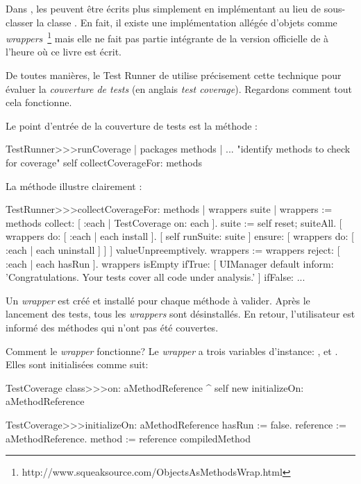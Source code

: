 \documentclass[a4paper,10pt,twoside]{book}
\begin{document}
Dans \pharo, les  peuvent être écrits plus simplement 
en implémentant  au lieu de sous-classer la classe .
En fait, il existe une implémentation allégée d'objets comme \emph{wrappers}~\footnote{http://www.squeaksource.com/ObjectsAsMethodsWrap.html} mais elle ne fait pas partie intégrante de la version officielle de \pharo à l'heure où ce livre est écrit.

De toutes manières, le Test Runner de \pharo utilise précisement cette technique pour évaluer la \emph{couverture de tests} (en anglais \emph{test coverage}).
Regardons comment tout cela fonctionne.

Le point d'entrée de la couverture de tests est la méthode :
\begin{code}{}
TestRunner>>>runCoverage
	| packages methods |
	... "identify methods to check for coverage"
	self collectCoverageFor: methods
\end{code}

La méthode  illustre clairement : %
\begin{code}{}
TestRunner>>>collectCoverageFor: methods
	| wrappers suite |
	wrappers := methods collect: [ :each | TestCoverage on: each ].
	suite := self
		reset;
		suiteAll.
	[ wrappers do: [ :each | each install ].
	  [ self runSuite: suite ] ensure: [ wrappers do: [ :each | each uninstall ] ] ] valueUnpreemptively.
	wrappers := wrappers reject: [ :each | each hasRun ].
	wrappers isEmpty 
		ifTrue: 
			[ UIManager default inform: 'Congratulations. Your tests cover all code under analysis.' ]
		ifFalse: ...
\end{code}
Un \emph{wrapper} est créé et installé pour chaque méthode à valider.
Après le lancement des tests, tous les \emph{wrappers} sont désinstallés.
En retour, l'utilisateur est informé des méthodes qui n'ont pas été couvertes. 

Comment le \emph{wrapper} fonctionne?
Le \emph{wrapper}  a trois variables d'instance: ,  et .
Elles sont initialisées comme suit:
\begin{code}{}
TestCoverage class>>>on: aMethodReference
	^ self new initializeOn: aMethodReference

TestCoverage>>>initializeOn: aMethodReference
	hasRun := false.
	reference := aMethodReference.
	method := reference compiledMethod
\end{code}
\end{document}
